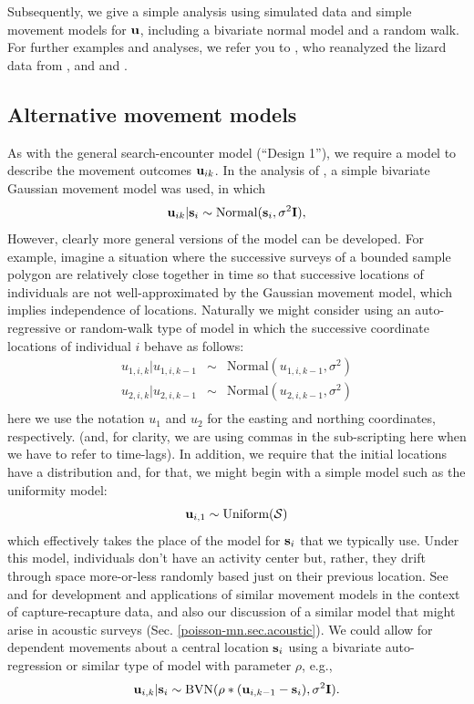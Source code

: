 Subsequently, we give a simple analysis using simulated data and
simple movement models for ${\bf u}$, including a bivariate normal
model and a random walk.
For further examples and analyses, we refer you to
\citet{royle_dorazio:2008}, who reanalyzed the lizard data from
\citet{royle_young:2008}, and \citet{efford:2011ecol} and
\citet{marques_etal:2011}.



\subsection{Alternative movement models}
\label{searchencounter.sec.movement}

As with the general search-encounter model (``Design 1''), we require
a model to describe the movement outcomes ${\bf u}_{ik}$.
In the analysis of \citet{royle_young:2008}, a simple bivariate
Gaussian movement model was used, in which
\[
 {\bf u}_{ik} | {\bf s}_{i} \sim \mbox{Normal}({\bf s}_{i}, \sigma^{2}{\bf I}),
\]
However, clearly more general versions of the model can be developed.
For example, imagine a situation where the successive surveys of a
bounded sample polygon are relatively close together in time so that
successive locations of individuals are not well-approximated by the
Gaussian movement model, which implies independence of
locations. Naturally we might consider using an auto-regressive or
random-walk type of model in which the successive coordinate locations
of individual $i$ behave as follows:
\begin{eqnarray*}
 u_{1,i,k} | u_{1,i,k-1} &\sim &  \mbox{Normal}( u_{1,i,k-1},  \sigma^{2}) \\
 u_{2,i,k} | u_{2,i,k-1} &\sim &  \mbox{Normal}( u_{2,i,k-1},  \sigma^{2}) \\
\end{eqnarray*}
here we use the notation $u_{1}$ and $u_{2}$ for the easting and
northing coordinates, respectively. (and, for clarity, we are using
commas in the sub-scripting here when we have to refer to time-lags).
 In addition, we require that the initial locations have a
distribution and, for that, we might begin with a simple model such as
the uniformity model:
\[
 {\bf u}_{i,1} \sim \mbox{Uniform}({\cal S})
\]
which effectively takes the place of the model for ${\bf s}_{i}$ that
we typically use. Under this model, individuals don't have an activity
center but, rather, they drift through space more-or-less randomly
based just on their previous location. See \citet{ovaskainen:2004} and
\citet{ovaskainen_etal:2008} for development and applications of similar
movement models in the context of capture-recapture data,
and also our discussion of a similar model that might arise in
acoustic surveys (Sec. \ref{poisson-mn.sec.acoustic}).  We could allow
for dependent movements about a central location ${\bf s}_{i}$ using a
bivariate auto-regression or similar type of model with parameter
$\rho$, e.g.,
\[
 {\bf u}_{i,k} | {\bf s}_{i} \sim   \mbox{BVN}( \rho*( {\bf u}_{i,k-1} - {\bf s}_{i} ),  \sigma^{2} {\bf I}).
\]

